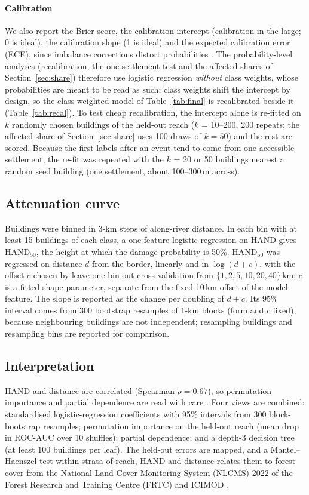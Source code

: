 \documentclass[journal,a4paper]{IEEEtran}
\begin{document}
\paragraph{Calibration} We also report the Brier score, the calibration intercept (calibration-in-the-large; 0 is ideal), the calibration slope (1 is ideal) and the expected calibration error (ECE), since imbalance corrections distort probabilities \citep{vandengoorbergh2022,carriero2025}. The probability-level analyses (recalibration, the one-settlement test and the affected shares of Section~\ref{sec:share}) therefore use logistic regression \emph{without} class weights, whose probabilities are meant to be read as such; class weights shift the intercept by design, so the class-weighted model of Table~\ref{tab:final} is recalibrated beside it (Table~\ref{tab:recal}). To test cheap recalibration, the intercept alone is re-fitted on $k$ randomly chosen buildings of the held-out reach ($k$ = 10--200, 200 repeats; the affected share of Section~\ref{sec:share} uses 100 draws of $k = 50$) and the rest are scored. Because the first labels after an event tend to come from one accessible settlement, the re-fit was repeated with the $k$ = 20 or 50 buildings nearest a random seed building (one settlement, about 100--300\,m across).

\subsection{Attenuation curve}
Buildings were binned in 3-km steps of along-river distance. In each bin with at least 15 buildings of each class, a one-feature logistic regression on HAND gives HAND$_{50}$, the height at which the damage probability is 50\%. HAND$_{50}$ was regressed on distance $d$ from the border, linearly and in $\log(d + c)$, with the offset $c$ chosen by leave-one-bin-out cross-validation from $\{1, 2, 5, 10, 20, 40\}$\,km; $c$ is a fitted shape parameter, separate from the fixed 10\,km offset of the model feature. The slope is reported as the change per doubling of $d + c$. Its 95\% interval comes from 300 bootstrap resamples of 1-km blocks (form and $c$ fixed), because neighbouring buildings are not independent; resampling buildings and resampling bins are reported for comparison.

\subsection{Interpretation}
HAND and distance are correlated (Spearman $\rho = 0.67$), so permutation importance and partial dependence are read with care \citep{molnar2022}. Four views are combined: standardised logistic-regression coefficients with 95\% intervals from 300 block-bootstrap resamples; permutation importance on the held-out reach (mean drop in ROC-AUC over 10 shuffles); partial dependence; and a depth-3 decision tree (at least 100 buildings per leaf). The held-out errors are mapped, and a Mantel--Haenszel test within strata of reach, HAND and distance relates them to forest cover from the National Land Cover Monitoring System (NLCMS) 2022 of the Forest Research and Training Centre (FRTC) and ICIMOD \citep{nlcms}.
\end{document}
